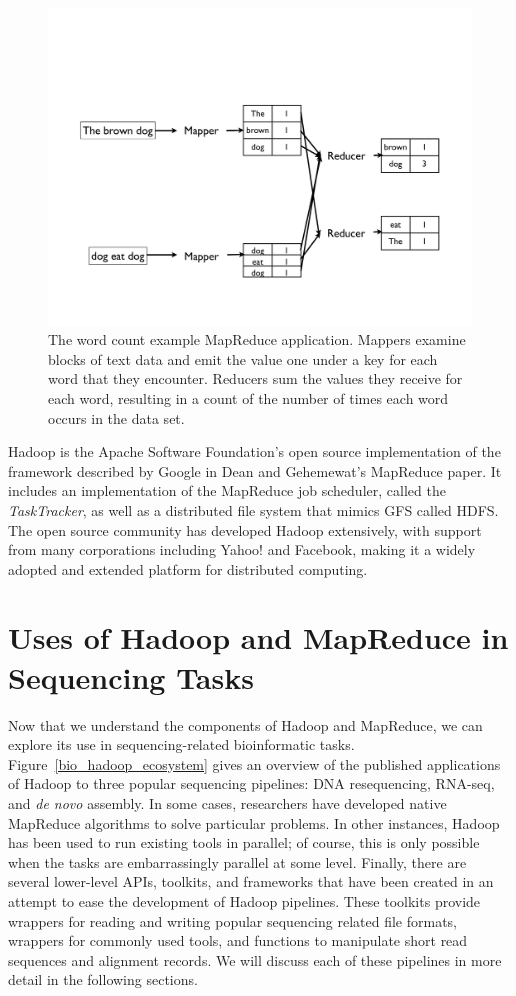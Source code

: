 \begin{figure}
\centering
\includegraphics[width=1\textwidth,trim=0in 1in 0in 3in,clip]{figures/mapreduce_example.pdf}
\caption{The word count example MapReduce application. Mappers examine blocks of text data and emit the value one under a key for each word that they encounter. Reducers sum the values they receive for each word, resulting in a count of the number of times each word occurs in the data set.}
\label{mapreduce_example}
\end{figure}

Hadoop is the Apache Software Foundation's open source implementation of the framework described by Google in Dean and Gehemewat's MapReduce paper. It includes an implementation of the MapReduce job scheduler, called the \emph{TaskTracker}, as well as a distributed file system that mimics GFS called HDFS. The open source community has developed Hadoop extensively, with support from many corporations including Yahoo! and Facebook, making it a widely adopted and extended platform for distributed computing.

\section{Uses of Hadoop and MapReduce in Sequencing Tasks}

Now that we understand the components of Hadoop and MapReduce, we can explore its use in sequencing-related bioinformatic tasks. Figure~\ref{bio_hadoop_ecosystem} gives an overview of the published applications of Hadoop to three popular sequencing pipelines: DNA resequencing, RNA-seq, and \emph{de novo} assembly. In some cases, researchers have developed native MapReduce algorithms to solve particular problems. In other instances, Hadoop has been used to run existing tools in parallel; of course, this is only possible when the tasks are embarrassingly parallel at some level. Finally, there are several lower-level APIs, toolkits, and frameworks that have been created in an attempt to ease the development of Hadoop pipelines. These toolkits provide wrappers for reading and writing popular sequencing related file formats, wrappers for commonly used tools, and functions to manipulate short read sequences and alignment records. We will discuss each of these pipelines in more detail in the following sections.

